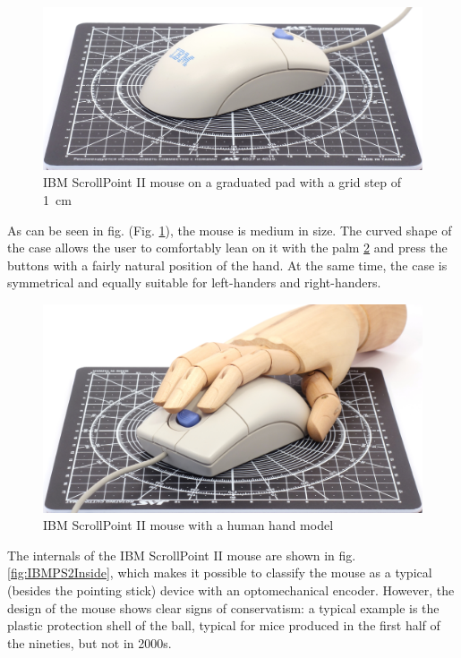 \documentclass[11pt, a4paper]{article}
\begin{document}
\begin{figure}[h]
    \centering
    \includegraphics[scale=0.54]{2000_ibm_scrollpoint_ii_mouse/size_30.jpg}
    \caption{IBM ScrollPoint II mouse on a graduated pad with a grid step of 1~cm}
    \label{fig:IBMPS2Size}
\end{figure}

As can be seen in fig. (Fig. \ref{fig:IBMPS2Size}), the mouse is medium in size. The curved shape of the case allows the user to comfortably lean on it with the palm \ref{fig:IBMScrollPointIIHand} and press the buttons with a fairly natural position of the hand. At the same time, the case is symmetrical and equally suitable for left-handers and right-handers.


\begin{figure}[h]
    \centering
    \includegraphics[scale=0.6]{2000_ibm_scrollpoint_ii_mouse/hand_30.jpg}
    \caption{IBM ScrollPoint II mouse with a human hand model}
    \label{fig:IBMScrollPointIIHand}
\end{figure}

The internals of the IBM ScrollPoint II mouse are shown in fig. \ref{fig:IBMPS2Inside}, which makes it possible to classify the mouse as a typical (besides the pointing stick) device with an optomechanical encoder. However, the design of the mouse shows clear signs of conservatism: a typical example is the plastic protection shell of the ball, typical for mice produced in the first half of the nineties, but not in 2000s.
\end{document}
